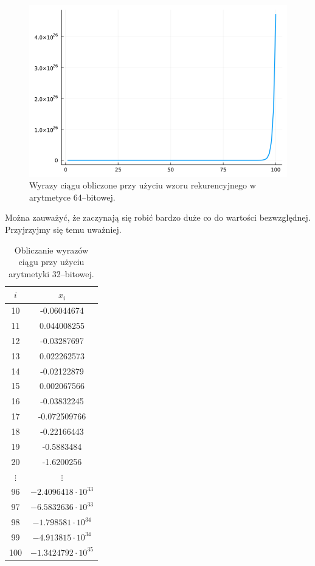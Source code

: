 \documentclass{article}
\begin{document}
\begin{figure}[!h]
    \centering
    \includegraphics[scale=0.4]{plot64_1.png}
    \caption{Wyrazy ciągu obliczone przy użyciu wzoru rekurencyjnego w arytmetyce 64--bitowej.}
    \label{fig:plot64_1}
\end{figure}

Można zauważyć, że zaczynają się robić bardzo duże co do wartości bezwzględnej. Przyjrzyjmy się temu uważniej.

\newpage


\begin{table}[!h]
    \centering
    \begin{tabular}{|c|c|}
            \hline
             \(i\) & \(x_i\) \\
             \hline \hline
            10 &  -0.06044674 \\
            11 &  0.044008255 \\
            12 &  -0.03287697 \\
            13 &  0.022262573 \\
            14 &  -0.02122879 \\
            15 &  0.002067566 \\
            16 &  -0.03832245 \\
            17 &  -0.072509766 \\
            18 &  -0.22166443 \\
            19 &  -0.5883484 \\
            20 &  -1.6200256 \\
            \(\vdots\) &  \(\vdots\) \\
            96 &  \(-2.4096418 \cdot 10^{33}\) \\
            97 &  \(-6.5832636 \cdot 10^{33} \)\\
            98 &  \(-1.798581 \cdot 10^{34} \) \\
            99 &  \(-4.913815 \cdot 10^{34} \)\\
            100 &  \(-1.3424792 \cdot 10^{35} \) \\
            \hline
    \end{tabular}
    \caption{Obliczanie wyrazów ciągu przy użyciu arytmetyki 32--bitowej.}
    \label{tab:rek_32}
\end{table}
\end{document}
